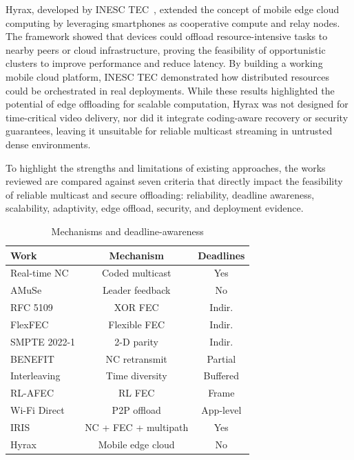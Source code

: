 \quad Hyrax, developed by INESC TEC~\cite{inesctec_hyrax}, extended the concept of mobile edge cloud computing by leveraging smartphones as cooperative compute and relay nodes. The framework showed that devices could offload resource-intensive tasks to nearby peers or cloud infrastructure, proving the feasibility of opportunistic clusters to improve performance and reduce latency. By building a working mobile cloud platform, INESC TEC demonstrated how distributed resources could be orchestrated in real deployments. While these results highlighted the potential of edge offloading for scalable computation, Hyrax was not designed for time-critical video delivery, nor did it integrate coding-aware recovery or security guarantees, leaving it unsuitable for reliable multicast streaming in untrusted dense environments.

\quad To highlight the strengths and limitations of existing approaches, the works reviewed are compared against seven criteria that directly impact the feasibility of reliable multicast and secure offloading: reliability, deadline awareness, scalability, adaptivity, edge offload, security, and deployment evidence.

\begin{table}[H]
	\centering
	\caption{Mechanisms and deadline-awareness}
	\label{tab:rw-feature-mech}
	\small
	\renewcommand{\arraystretch}{1.15}
	\setlength{\tabcolsep}{4pt}
	\begin{tabular}{|l|c|c|}
		\hline
		\textbf{Work} & \textbf{Mechanism} & \textbf{Deadlines} \\
		\hline
		Real-time NC \cite{ferreira2019realtime} & Coded multicast & Yes \\
		AMuSe \cite{amaldi2010amuse} & Leader feedback & No \\
		RFC 5109 \cite{perkins2003rfc5109} & XOR FEC & Indir. \\
		FlexFEC \cite{perkins2019flexfec} & Flexible FEC & Indir. \\
		SMPTE 2022-1 \cite{smpte2022} & 2-D parity & Indir. \\
		BENEFIT \cite{qureshi2011benefit} & NC retransmit & Partial \\
		Interleaving \cite{adalier2009interleaving} & Time diversity & Buffered \\
		RL-AFEC \cite{chen2018rlafec} & RL FEC & Frame \\
		Wi-Fi Direct \cite{sha2016wifidirect,poderys2017overlay,androidWFD} & P2P offload & App-level \\
		IRIS \cite{martins2018iris} & NC + FEC + multipath & Yes \\
		Hyrax \cite{inesctec_hyrax} & Mobile edge cloud & No \\
		\hline
	\end{tabular}
\end{table}


